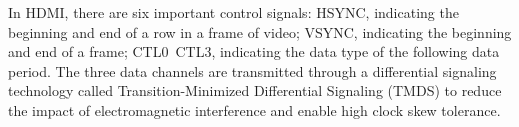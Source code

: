 \documentclass[]{spie}  %
\begin{document}

In HDMI, there are six important control signals: HSYNC, indicating the beginning and end of a row in a frame of video; VSYNC, indicating the beginning and end of a frame; CTL0~CTL3, indicating the data type of the following data period. The three data channels are transmitted through a differential signaling technology called Transition-Minimized Differential Signaling (TMDS) to reduce the impact of electromagnetic interference and enable high clock skew tolerance. %
\end{document}
